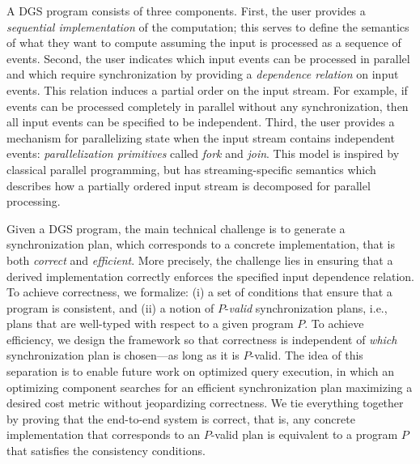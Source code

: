 A DGS program consists of three components. First, the user provides a \emph{sequential implementation} of the computation; this serves to define the semantics of what they want to compute assuming the input is processed as a sequence of events.
Second, the user indicates which input events can be processed in parallel and which require synchronization by providing a \emph{dependence relation} on input events.
This relation induces a partial order on the input stream.
For example, if events can be processed completely in parallel without any synchronization, then all input events can be specified to be independent.
Third, the user provides a mechanism for parallelizing state when the input stream contains independent events: \emph{parallelization primitives} called \emph{fork} and \emph{join}. This model is inspired by classical parallel programming, but has streaming-specific semantics which describes how a partially ordered input stream is decomposed for parallel processing.

Given a DGS program, the main technical challenge is to generate
a synchronization plan, which corresponds to a concrete implementation, that is both \emph{correct} and \emph{efficient}. More precisely, the challenge lies in ensuring that a derived implementation correctly enforces the specified input dependence relation. To achieve correctness, we formalize: (i) a set of conditions that ensure that a program is consistent, and (ii) a notion of $P$-\emph{valid} synchronization plans, i.e., plans that are well-typed with respect to a given program $P$.
To achieve efficiency, we design the framework so that correctness is independent of \emph{which} synchronization plan is chosen---as long as it is $P$-valid.
The idea of this separation is to enable future work on optimized query execution, in which an optimizing component searches for an efficient synchronization plan maximizing a desired cost metric without jeopardizing correctness.
We tie everything together by proving that the end-to-end system is correct,
that is, any concrete implementation that corresponds to an $P$-valid plan is equivalent to a program $P$ that satisfies the consistency conditions.

